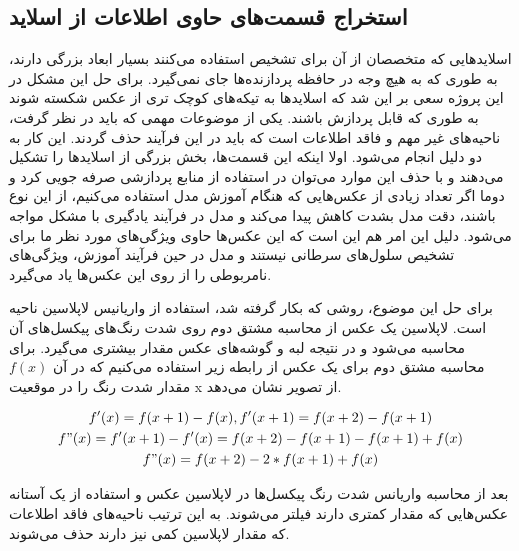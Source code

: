 \subsection{استخراج قسمت‌های حاوی اطلاعات از اسلاید}\label{subsec:استخراج قسمت‌های حاوی اطلاعات از اسلاید}

اسلاید‌هایی که متخصصان از آن برای تشخیص استفاده می‌کنند بسیار ابعاد بزرگی دارند، به طوری که به هیچ وجه در
حافظه پردازنده‌ها جای نمی‌گیرد.
برای حل این مشکل در این پروژه سعی بر این شد که اسلاید‌ها به تیکه‌های کوچک تری از عکس شکسته شوند به طوری که قابل پردازش باشند.
یکی از موضوعات مهمی که باید در نظر گرفت، ناحیه‌های غیر مهم و فاقد اطلاعات است که باید در این فرآیند حذف گردند. این کار به دو دلیل انجام می‌شود.
اولا اینکه این قسمت‌ها، بخش بزرگی از اسلاید‌ها را تشکیل می‌دهند و با حذف این موارد می‌توان در استفاده از منابع پردازشی صرفه جویی کرد
و دوما اگر تعداد زیادی از عکس‌هایی که هنگام آموزش مدل استفاده می‌کنیم، از این نوع باشند، دقت مدل بشدت کاهش پیدا می‌کند و مدل در فرآیند یادگیری با مشکل مواجه می‌شود.
دلیل این امر هم این است که این عکس‌ها حاوی ویژگی‌های مورد نظر ما برای تشخیص سلول‌های سرطانی نیستند و مدل در حین فرآیند آموزش، ویژگی‌های نامربوطی را از روی این عکس‌ها یاد می‌گیرد.

برای حل این موضوع، روشی که بکار گرفته شد، استفاده از واریانیس لاپلاسین ناحیه است.
لاپلاسین یک عکس از محاسبه مشتق دوم روی شدت رنگ‌های پیکسل‌های آن محاسبه می‌شود
و در نتیجه لبه و گوشه‌های عکس مقدار بیشتری می‌گیرد.
برای محاسبه مشتق دوم برای یک عکس از رابطه زیر استفاده می‌کنیم که در آن $f(x)$ مقدار شدت رنگ را در موقعیت x از تصویر نشان می‌دهد.

\begin{gather*}
    f'(x) = f(x+1) - f(x), f'(x+1) = f(x+2) - f(x+1)\\
    f"(x) = f'(x+1) - f'(x)= f(x+2) - f(x+1) - f(x+1) + f(x)\\
    f"(x) = f(x+2) - 2*f(x+1) + f(x)\\
\end{gather*}

بعد از محاسبه واریانس شدت رنگ پیکسل‌ها در لاپلاسین عکس و استفاده از یک آستانه عکس‌هایی که مقدار کمتری دارند فیلتر می‌شوند.
به این ترتیب ناحیه‌های فاقد اطلاعات که مقدار لاپلاسین کمی نیز دارند حذف می‌شوند.


